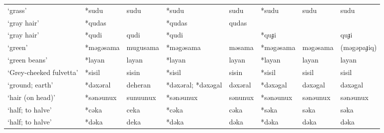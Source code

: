 \begin{landscape}
\begin{longtable}[c]{@{}p{3cm}<{\raggedright}p{2.75cm}<{\raggedright}p{2.75cm}<{\raggedright}p{2.75cm}<{\raggedright}p{2.75cm}<{\raggedright}p{2.75cm}<{\raggedright}p{2.75cm}<{\raggedright}p{2.75cm}<{\raggedright}@{}}
`grass'                                              & *sudu              & sudu                           & *sudu              & sudu                       & *sudu            & sudu                     & sudu                              \\
`gray hair'                                          & *qudas             &                                & *qudas             & qudas                      &                  &                          &                                   \\
`gray hair'                                          & *qudi              & qudi                           & *qudi              &                            & *quɟi            &                          & quɟi                              \\
`green'                                              & *məgəsama          & mugusama                       & *məgəsama          & məsama                     & *məgəsama        & məgəsama                 & (məgəpaɟiq)                       \\
`green beans'                                        & *layan             & layan                          & *layan             & layan                      & *layan           & layan                    & layan                             \\
`Grey-cheeked fulvetta'                              & *sisil             & sisin                          & *sisil             & sisin                      & *sisil           & sisil                    & sisil                             \\
`ground; earth'                                      & *dəxəral           & deheran                        & *dəxəral; *dəxəgal & dəxəral                    & *dəxəgal         & dəxəgal                  & dəxəgal                           \\
`hair (on head)'                                     & *sənəunux          & sunuunux                       & *sənəunux          & sənunux                    & *sənəunux        & sənəunux                 & sənəunux                          \\
`half; to halve'                                     & *cəka              & ceka                           & *cəka              & cəka                       & *səka            & səka                     & səka                              \\
`half; to halve'                                     & *dəka              & deka                           & *dəka              & dəka                       & *dəka            & dəka                     & dəka                              \\

\end{longtable}
\end{landscape}
